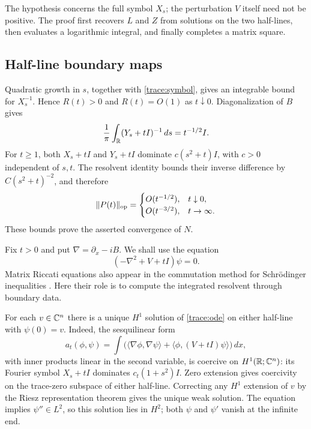 The hypothesis concerns the full symbol $X_s$; the perturbation
$V$ itself need not be positive.  The proof first recovers $L$ and
$Z$ from solutions on the two half-lines, then evaluates a logarithmic
integral, and finally completes a matrix square.

\subsection{Half-line boundary maps}

Quadratic growth in $s$, together with \eqref{trace:symbol}, gives
an integrable bound for $X_s^{-1}$.  Hence $R(t)>0$ and
$R(t)=O(1)$ as $t\downarrow0$.  Diagonalization of $B$ gives
\[
 \frac1\pi\int_\mathbb R(Y_s+tI)^{-1}\,ds=t^{-1/2}I.
\]
For $t\geq1$, both $X_s+tI$ and $Y_s+tI$ dominate
$c(s^2+t)I$, with $c>0$ independent of $s,t$.
The resolvent identity bounds their inverse difference by
$C(s^2+t)^{-2}$, and therefore
\begin{equation}\label{trace:P-bounds}
 \|P(t)\|_{\operatorname{op}}=
 \begin{cases}
  O(t^{-1/2}),&t\downarrow0,\\
  O(t^{-3/2}),&t\to\infty.
 \end{cases}
\end{equation}
These bounds prove the asserted convergence of $N$.

Fix $t>0$ and put $\nabla=\partial_x-iB$.  We shall use the
equation
\begin{equation}\label{trace:ode}
 (-\nabla^2+V+tI)\psi=0.
\end{equation}
Matrix Riccati equations also appear in the commutation method for
Schr\"odinger inequalities \cite{BenguriaLoss2000}.  Here their role
is to compute the integrated resolvent through boundary data.

For each $v\in\mathbb C^n$ there is a unique $H^1$ solution of
\eqref{trace:ode} on either half-line with $\psi(0)=v$.
Indeed, the sesquilinear form
\[
 a_t(\phi,\psi)=\int
  \bigl(\langle\nabla\phi,\nabla\psi\rangle
       +\langle\phi,(V+tI)\psi\rangle\bigr)\,dx,
\]
with inner products linear in the second variable, is coercive on
$H^1(\mathbb R;\mathbb C^n)$: its Fourier symbol $X_s+tI$ dominates
$c_t(1+s^2)I$.  Zero extension gives coercivity on the trace-zero
subspace of either half-line.  Correcting any $H^1$ extension of
$v$ by the Riesz representation theorem gives the unique weak
solution.  The equation implies $\psi''\in L^2$, so this solution
lies in $H^2$; both $\psi$ and $\psi'$ vanish at the infinite end.

